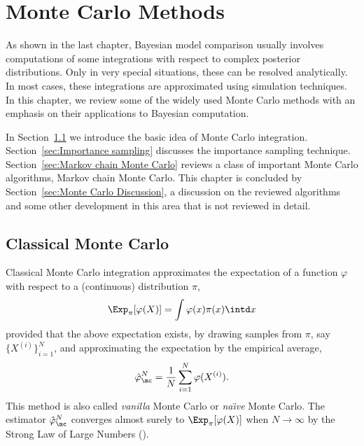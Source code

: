\chapter{Monte Carlo Methods}
\label{cha:Monte Carlo Methods}

As shown in the last chapter, Bayesian model comparison usually involves
computations of some integrations with respect to complex posterior
distributions. Only in very special situations, these can be resolved
analytically. In most cases, these integrations are approximated using
simulation techniques. In this chapter, we review some of the widely used
Monte Carlo methods with an emphasis on their applications to Bayesian
computation.

In Section~\ref{sec:Classical Monte Carlo} we introduce the basic idea of
Monte Carlo integration. Section~\ref{sec:Importance sampling} discusses the
importance sampling technique. Section~\ref{sec:Markov chain Monte Carlo}
reviews a class of important Monte Carlo algorithms, Markov chain Monte Carlo.
This chapter is concluded by Section~\ref{sec:Monte Carlo Discussion}, a
discussion on the reviewed algorithms and some other development in this area
that is not reviewed in detail.

\section{Classical Monte Carlo}
\label{sec:Classical Monte Carlo}

Classical Monte Carlo integration approximates the expectation of a function
$\varphi$ with respect to a (continuous) distribution $\pi$,
\begin{equation*}
  \Exp_{\pi}[\varphi(X)] = \int\varphi(x)\pi(x)\intd x
\end{equation*}
provided that the above expectation exists, by drawing \iid samples from
$\pi$, say $\{X^{(i)}\}_{i=1}^N$, and approximating the expectation by the
empirical average,
\begin{equation}
  \hat\varphi_{\mc}^N = \frac{1}{N}\sum_{i=1}^N\varphi(X^{(i)}).
  \label{eq:vanilla mc}
\end{equation}
This method is also called \emph{vanilla} Monte Carlo or \emph{na\"\i ve}
Monte Carlo. The estimator $\hat\varphi_{\mc}^N$ converges almost surely to
$\Exp_{\pi}[\varphi(X)]$ when $N\to\infty$ by the Strong Law of Large Numbers
(\slln).

